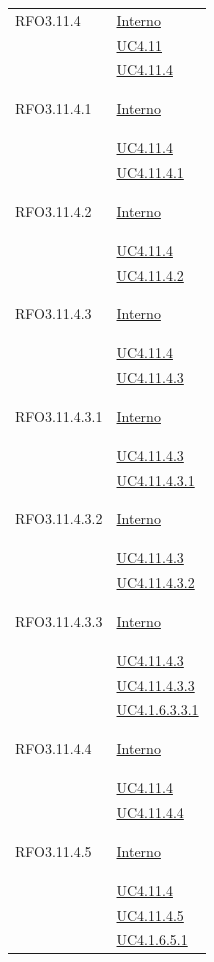 \begin{itemize}
\begin{itemize}
\begin{itemize}
\begin{itemize}
\begin{longtable}{|>{\centering}m{5cm}|m{5cm}<{\centering}|}
\hypertarget{RFO3.11.4}{RFO3.11.4} & \hyperlink{Interno}{Interno}\\
&\hyperref[UC4.11]{UC4.11}\\
&\hyperref[UC4.11.4]{UC4.11.4}\\ \hline

\hypertarget{RFO3.11.4.1}{RFO3.11.4.1} & \hyperlink{Interno}{Interno}\\
&\hyperref[UC4.11.4]{UC4.11.4}\\
&\hyperref[UC4.11.4.1]{UC4.11.4.1}\\ \hline

\hypertarget{RFO3.11.4.2}{RFO3.11.4.2} & \hyperlink{Interno}{Interno}\\
&\hyperref[UC4.11.4]{UC4.11.4}\\
&\hyperref[UC4.11.4.2]{UC4.11.4.2}\\ \hline

\hypertarget{RFO3.11.4.3}{RFO3.11.4.3} & \hyperlink{Interno}{Interno}\\
&\hyperref[UC4.11.4]{UC4.11.4}\\
&\hyperref[UC4.11.4.3]{UC4.11.4.3}\\ \hline

\hypertarget{RFO3.11.4.3.1}{RFO3.11.4.3.1} & \hyperlink{Interno}{Interno}\\
& \hyperref[UC4.11.4.3]{UC4.11.4.3}\\
& \hyperref[UC4.11.4.3.1]{UC4.11.4.3.1}\\ \hline

\hypertarget{RFO3.11.4.3.2}{RFO3.11.4.3.2} & \hyperlink{Interno}{Interno}\\
& \hyperref[UC4.11.4.3]{UC4.11.4.3}\\
& \hyperref[UC4.11.4.3.2]{UC4.11.4.3.2}\\ \hline

\hypertarget{RFO3.11.4.3.3}{RFO3.11.4.3.3} & \hyperlink{Interno}{Interno}\\
& \hyperref[UC4.11.4.3]{UC4.11.4.3}\\
&\hyperref[UC4.11.4.3.3]{UC4.11.4.3.3}\\
&\hyperref[UC4.1.6.3.3.1]{UC4.1.6.3.3.1}\\ \hline

\hypertarget{RFO3.11.4.4}{RFO3.11.4.4} & \hyperlink{Interno}{Interno}\\
&\hyperref[UC4.11.4]{UC4.11.4}\\
&\hyperref[UC4.11.4.4]{UC4.11.4.4}\\ \hline

\hypertarget{RFO3.11.4.5}{RFO3.11.4.5} & \hyperlink{Interno}{Interno}\\
&\hyperref[UC4.11.4]{UC4.11.4}\\
&\hyperref[UC4.11.4.5]{UC4.11.4.5}\\
&\hyperref[UC4.1.6.5.1]{UC4.1.6.5.1}\\ \hline


\end{longtable}
\end{itemize}
\end{itemize}
\end{itemize}
\end{itemize}
